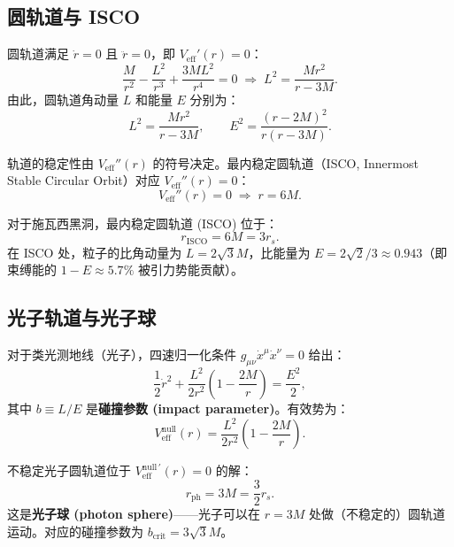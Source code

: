 \subsection{圆轨道与 ISCO}

圆轨道满足 $\dot r = 0$ 且 $\ddot r = 0$，即 $V_{\text{eff}}'(r) = 0$：
\begin{equation}
    \frac{M}{r^2} - \frac{L^2}{r^3} + \frac{3ML^2}{r^4} = 0 \;\Longrightarrow\; L^2 = \frac{Mr^2}{r-3M}.
\end{equation}
由此，圆轨道角动量 $L$ 和能量 $E$ 分别为：
\begin{equation}
    L^2 = \frac{Mr^2}{r-3M}, \qquad E^2 = \frac{(r-2M)^2}{r(r-3M)}.
\end{equation}

轨道的稳定性由 $V_{\text{eff}}''(r)$ 的符号决定。最内稳定圆轨道（ISCO, Innermost Stable Circular Orbit）对应 $V_{\text{eff}}''(r)=0$：
\begin{equation}
    V_{\text{eff}}''(r) = 0 \;\Longrightarrow\; r = 6M.
    \label{eq:ISCO}
\end{equation}

\begin{theorem}
对于施瓦西黑洞，最内稳定圆轨道 (ISCO) 位于：
\begin{equation}
    \boxed{r_{\text{ISCO}} = 6M = 3r_s}.
\end{equation}
在 ISCO 处，粒子的比角动量为 $L = 2\sqrt{3}M$，比能量为 $E = 2\sqrt{2}/3 \approx 0.943$（即束缚能的 $1 - E \approx 5.7\%$ 被引力势能贡献）。
\end{theorem}

\subsection{光子轨道与光子球}

对于类光测地线（光子），四速归一化条件 $g_{\mu\nu}\dot x^\mu\dot x^\nu = 0$ 给出：
\begin{equation}
    \frac{1}{2}\dot r^2 + \frac{L^2}{2r^2}\left(1 - \frac{2M}{r}\right) = \frac{E^2}{2},
\end{equation}
其中 $b \equiv L/E$ 是\textbf{碰撞参数 (impact parameter)}。有效势为：
\begin{equation}
    V_{\text{eff}}^{\text{null}}(r) = \frac{L^2}{2r^2}\left(1 - \frac{2M}{r}\right).
\end{equation}

\begin{theorem}[光子球]
不稳定光子圆轨道位于 $V_{\text{eff}}^{\text{null}\,'}(r) = 0$ 的解：
\begin{equation}
    \boxed{r_{\text{ph}} = 3M = \frac{3}{2}r_s}.
\end{equation}
这是\textbf{光子球 (photon sphere)}——光子可以在 $r=3M$ 处做（不稳定的）圆轨道运动。对应的碰撞参数为 $b_{\text{crit}} = 3\sqrt{3}M$。
\end{theorem}

